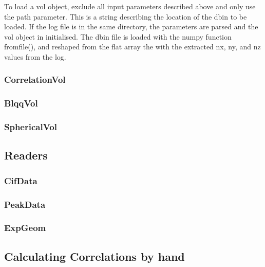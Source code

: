 \documentclass[a4, 12pt]{article}
\begin{document}
To load a vol object, exclude all input parameters described above and only use the path parameter. This is a string describing the location of the dbin to be loaded. If the log file is in the same directory, the parameters are parsed and the vol object in initialised. The dbin file is loaded with the numpy function fromfile(), and reshaped from the flat array the with the extracted nx, ny, and nz values from the log.
 



\subsubsection{CorrelationVol}





\subsubsection{BlqqVol}
\subsubsection{SphericalVol}

\subsection{Readers}

\subsubsection{CifData}
\subsubsection{PeakData}
\subsubsection{ExpGeom}

\subsection{Calculating Correlations by hand}

 
\end{document}
